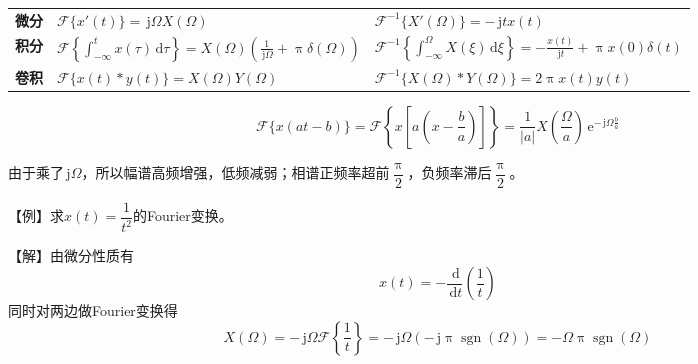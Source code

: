 \documentclass[UTF8,fontset=fandol,zihao=5]{ctexart}
\newcommand{\jj}{\,\mathrm{j}}
\newcommand{\ee}{\,\mathrm{e}}
\newcommand{\dd}{\,\mathrm{d}}
\newcommand{\FF}{\mathcal{F}}
\begin{document}
\begin{enumerate}
\begin{center}
\begin{tabularx}{0.98\textwidth}{>{\bfseries}p{1.5cm}X X}
    微分
    &
    $\displaystyle
    \FF \{ x'(t) \}
    =
    \jj \varOmega X(\varOmega)
    $


    &
    $\displaystyle
    \FF^{-1} \{ X'(\varOmega) \}
    =
    -\jj t x(t)
    $
    \\

    积分
    &
    $\displaystyle
    \FF
    \left\{
    \int_{-\infty}^{t} x(\tau)\dd\tau
    \right\}
    =
    X(\varOmega)
    \left(
    \frac{1}{\jj\varOmega}
    +
    \uppi\delta(\varOmega)
    \right)
    $
    &
    $\displaystyle
    \FF^{-1}
    \left\{
    \int_{-\infty}^{\varOmega} X(\xi)\dd\xi
    \right\}
    =
    -\frac{x(t)}{\jj t}
    +
    \uppi x(0)\delta(t)
    $
    \\

    卷积
    &
    $\displaystyle
    \FF \{ x(t)\ast y(t) \}
    =
    X(\varOmega)Y(\varOmega)
    $
    &
    $\displaystyle
    \FF^{-1}
    \{ X(\varOmega)\ast Y(\varOmega) \}
    =
    2\uppi x(t)y(t)
    $
    \\

    \bottomrule
    \end{tabularx}
    \end{center}

\end{enumerate}

\begin{methodbox}[【技巧】时移与尺度变换对应]
  \[
  \FF \{x(at-b)\}=\FF \left\{x\left[ a \left( x - \frac{b}{a} \right)  \right] \right\} = \frac{1}{|a|} X \left( \frac{\varOmega}{a} \right) \ee^{-\jj \varOmega \frac{b}{a}}
  \]
\end{methodbox}


\begin{methodbox}[【理解】微分的实际意义]
  由于乘了$\jj \varOmega$，所以幅谱高频增强，低频减弱；相谱正频率超前$\dfrac{\uppi}{2}$，负频率滞后$\dfrac{\uppi}{2}$。
\end{methodbox}

\begin{methodbox}[【技巧】用微分性质求Fourier变换]
  【例】求$x(t)=\dfrac{1}{t^2}$的Fourier变换。
  
  【解】由微分性质有
  \[
  x(t)=-\frac{\dd}{\dd t}\left ( \frac{1}{t} \right )
  \]
  同时对两边做Fourier变换得
  \[
  X(\varOmega) = -\jj \varOmega \FF \left \{ \frac{1}{t} \right \} = -\jj \varOmega \left ( -\jj \uppi \operatorname{sgn}(\varOmega) \right ) = - \varOmega \uppi \operatorname{sgn} (\varOmega)
  \]
\end{methodbox}
\end{document}
